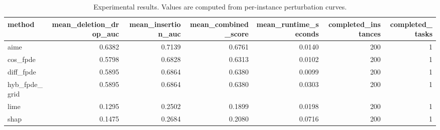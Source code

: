 \begin{table}[t]
\caption{Experimental results. Values are computed from per-instance perturbation curves.}
\label{tab:main_results_computed}
\centering
\begin{tabular}{lrrrrrr}
\toprule
method & mean\_deletion\_drop\_auc & mean\_insertion\_auc & mean\_combined\_score & mean\_runtime\_seconds & completed\_instances & completed\_tasks \\
\midrule
aime & 0.6382 & 0.7139 & 0.6761 & 0.0140 & 200 & 1 \\
cos\_fpde & 0.5798 & 0.6828 & 0.6313 & 0.0102 & 200 & 1 \\
diff\_fpde & 0.5895 & 0.6864 & 0.6380 & 0.0099 & 200 & 1 \\
hyb\_fpde\_grid & 0.5895 & 0.6864 & 0.6380 & 0.0303 & 200 & 1 \\
lime & 0.1295 & 0.2502 & 0.1899 & 0.0198 & 200 & 1 \\
shap & 0.1475 & 0.2684 & 0.2080 & 0.0716 & 200 & 1 \\
\bottomrule
\end{tabular}

\end{table}
